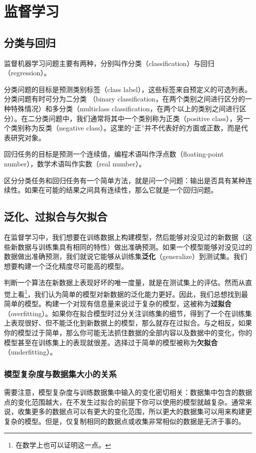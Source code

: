 \chapter{监督学习}
\section{分类与回归}
监督机器学习问题主要有两种，分别叫作分类（classification）与回归（regression）。

分类问题的目标是预测类别标签（class label），这些标签来自预定义的可选列表。分类问题有时可分为二分类
（binary classification，在两个类别之间进行区分的一种特殊情况）和多分类（multiclass classification，在两个以上的类别之间进行区分）。在二分类问题中，我们通常将其中一个类别称为正类（positive class），另一个类别称为反类（negative class）。这里的“正”并不代表好的方面或正数，而是代表研究对象。

回归任务的目标是预测一个连续值，编程术语叫作浮点数（floating-point number），数学术语叫作实数（real number）。


区分分类任务和回归任务有一个简单方法，就是问一个问题：输出是否具有某种连续性。如果在可能的结果之间具有连续性，那么它就是一个回归问题。

\section{泛化、过拟合与欠拟合}
在监督学习中，我们想要在训练数据上构建模型，然后能够对没见过的新数据（这些新数据与训练集具有相同的特性）做出准确预测。如果一个模型能够对没见过的数据做出准确预测，我们就说它能够从训练集\textbf{泛化}（generalize）到测试集。我们想要构建一个泛化精度尽可能高的模型。

判断一个算法在新数据上表现好坏的唯一度量，就是在测试集上的评估。然而从直觉上看\footnote{在数学上也可以证明这一点。}，我们认为简单的模型对新数据的泛化能力更好。因此，我们总想找到最简单的模型。构建一个对现有信息量来说过于复杂的模型，这被称为\textbf{过拟合}（overfitting）。如果你在拟合模型时过分关注训练集的细节，得到了一个在训练集上表现很好、但不能泛化到新数据上的模型，那么就存在过拟合。与之相反，如果你的模型过于简单，那么你可能无法抓住数据的全部内容以及数据中的变化，你的模型甚至在训练集上的表现就很差。选择过于简单的模型被称为\textbf{欠拟合}（underfitting）。

\subsection*{模型复杂度与数据集大小的关系}
需要注意，模型复杂度与训练数据集中输入的变化密切相关：数据集中包含的数据点的变化范围越大，在不发生过拟合的前提下你可以使用的模型就越复杂。通常来说，收集更多的数据点可以有更大的变化范围，所以更大的数据集可以用来构建更复杂的模型。但是，仅复制相同的数据点或收集非常相似的数据是无济于事的。


